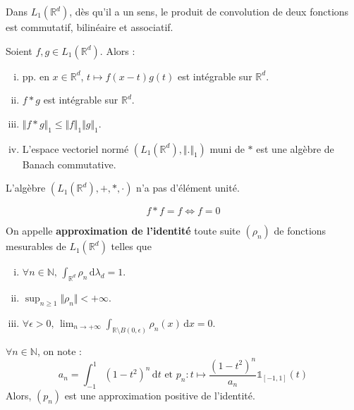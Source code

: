 	\begin{proposition}
		Dans $L_1(\mathbb{R}^d)$, dès qu'il a un sens, le produit de convolution de deux fonctions est commutatif, bilinéaire et associatif.
	\end{proposition}

	\begin{theorem}
		Soient $f, g \in L_1(\mathbb{R}^d)$. Alors :
		\begin{enumerate}[(i)]
			\item pp. en $x \in \mathbb{R}^d$, $t \mapsto f(x-t)g(t)$ est intégrable sur $\mathbb{R}^d$.
			\item $f * g$ est intégrable sur $\mathbb{R}^d$.
			\item $\Vert f * g \Vert_1 \leq \Vert f \Vert_1 \Vert g \Vert_1$.
			\item L'espace vectoriel normé $(L_1(\mathbb{R}^d), \Vert . \Vert_1)$ muni de $*$ est une algèbre de Banach commutative.
		\end{enumerate}
	\end{theorem}


	\begin{proposition}
		L'algèbre $(L_1(\mathbb{R}^d), +, *, \cdot)$ n'a pas d'élément unité.
	\end{proposition}

	\begin{application}
		\[ f * f = f \iff f = 0 \]
	\end{application}


	\begin{definition}
		On appelle \textbf{approximation de l'identité} toute suite $(\rho_n)$ de fonctions mesurables de $L_1(\mathbb{R}^d)$ telles que
		\begin{enumerate}[(i)]
			\item $\forall n \in \mathbb{N}, \, \int_{\mathbb{R}^d} \rho_n \, \mathrm{d}\lambda_d = 1$.
			\item $\sup_{n \geq 1} \Vert \rho_n \Vert < +\infty$.
			\item $\forall \epsilon > 0, \, \lim_{n \rightarrow +\infty} \int_{\mathbb{R} \setminus B(0, \epsilon)} \rho_n(x) \, \mathrm{d}x = 0$.
		\end{enumerate}
	\end{definition}


	\begin{example}
		$\forall n \in \mathbb{N}$, on note :
		\[ a_n = \int_{-1}^1 (1-t^2)^n \, \mathrm{d}t \text{ et } p_n : t \mapsto \frac{(1-t^2)^n}{a_n} \mathbb{1}_{[-1, 1]}(t) \]
		Alors, $(p_n)$ est une approximation positive de l'identité.
	\end{example}

